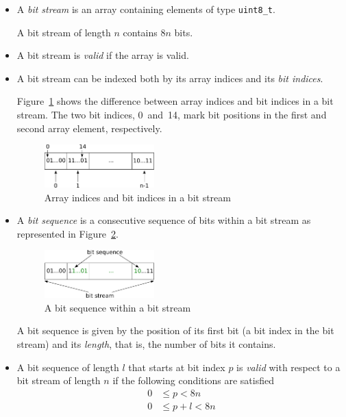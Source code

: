 \begin{itemize}
\item
A \emph{bit stream} is an array containing elements of type \verb"uint8_t".

A bit stream of length $n$ contains $8n$ bits.

\item
A bit stream is \emph{valid} if the array is valid.

\item 
A bit stream can be indexed both by its array indices
and its \emph{bit indices}.

Figure~\ref{fig:bitstream-indices} shows the difference between 
array indices and bit indices in a bit stream.
The two bit indices, 0~and~14,
mark bit positions in the first and second array element, respectively.

\begin{figure}[hbt]
\begin{center}
\includegraphics[width=0.40\textwidth]{figures/array_as_stream.pdf}
\caption{\label{fig:bitstream-indices} Array indices and bit indices in a bit stream}
\end{center}
\end{figure}


\item
A \emph{bit sequence} is a consecutive sequence of bits within a bit stream
as represented in Figure~\ref{fig:bitsequence}.
\begin{figure}[hbt]
\begin{center}
\includegraphics[width=0.40\textwidth]{figures/bit_sequence.pdf}
\caption{\label{fig:bitsequence} A bit sequence within a bit stream}
\end{center}
\end{figure}

A bit sequence is given by the position of its first bit (a bit index in the bit stream)
and its \emph{length}, that is, the number of bits it contains.

\item A bit sequence of length $l$ that starts at bit index $p$ is \emph{valid}
     with respect to a bit stream of length $n$ if the following conditions are
     satisfied
     \begin{align*}
         0 &\leq p < 8n \\
         0 &\leq p + l < 8n
     \end{align*}


\end{itemize}
